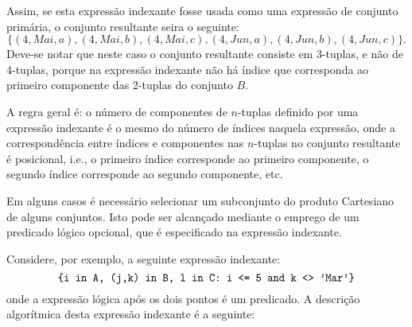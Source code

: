 \documentclass[11pt, brazil]{report}
\begin{document}
\noindent Assim, se esta expressão indexante fosse usada como uma expressão de conjunto
primária, o conjunto resultante seira o seguinte:
$$\{(4,Mai,a),(4,Mai,b),(4,Mai,c),(4,Jun,a),(4,Jun,b),(4,Jun,c)\}.$$
Deve-se notar que neste caso o conjunto resultante consiste em 3-tuplas,
e não de 4-tuplas, porque na expressão indexante não há índice que
corresponda ao primeiro componente das 2-tuplas do conjunto $B$.


A regra geral é: o número de componentes de $n$-tuplas definido por
uma expressão indexante é o mesmo do número de índices naquela expressão,
onde a correspondência entre índices e componentes nas $n$-tuplas no
conjunto resultante é posicional, i.e., o primeiro índice corresponde
ao primeiro componente, o segundo índice corresponde ao segundo
componente, etc.


Em alguns casos é necessário selecionar um subconjunto do produto
Cartesiano de alguns \linebreak conjuntos. Isto pode ser alcançado mediante o
emprego de um predicado lógico opcional, que é especificado na
expressão indexante.


Considere, por exemplo, a seguinte expressão indexante:
$$\mbox{{\tt\{i in A, (j,k) in B, l in C: i <= 5 and k <> 'Mar'\}}}$$
onde a expressão lógica após os dois pontos é um predicado. A
descrição algorítmica desta expressão indexante é a seguinte:
\end{document}
